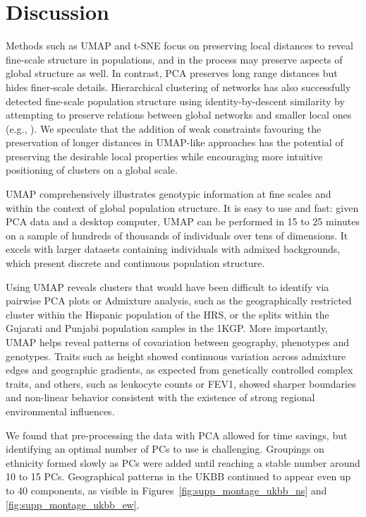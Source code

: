 \section{Discussion}
Methods such as UMAP and t-SNE focus on preserving local distances to reveal fine-scale structure in populations, and in the process may preserve aspects of global structure as well. In contrast, PCA preserves long range distances but hides finer-scale details. Hierarchical clustering of networks has also successfully detected fine-scale population structure using identity-by-descent similarity by attempting to preserve relations between global networks and smaller local ones (e.g., \citep{han2017clustering}). We speculate that the addition of weak constraints favouring the preservation of longer distances in UMAP-like approaches has the potential of preserving the desirable local properties while encouraging more intuitive positioning of clusters on a global scale.

UMAP comprehensively illustrates genotypic information at fine scales and within the context of global population structure. It is easy to use and fast: given PCA data and a desktop computer, UMAP can be performed in 15 to 25 minutes on a sample of hundreds of thousands of individuals over tens of dimensions. It excels with larger datasets containing individuals with admixed backgrounds, which present discrete and continuous population structure.

Using UMAP reveals clusters that would have been difficult to identify via pairwise PCA plots or Admixture analysis, such as the geographically restricted cluster within the Hispanic population of the HRS, or the splits within the Gujarati and Punjabi population samples in the 1KGP. More importantly, UMAP helps reveal patterns of covariation between geography, phenotypes and genotypes. Traits such as height showed continuous variation across admixture edges and geographic gradients, as expected from genetically controlled complex traits, and others, such as leukocyte counts or FEV1, showed sharper boundaries and non-linear behavior consistent with the existence of strong regional environmental influences. 

We found that pre-processing the data with PCA allowed for time savings, but identifying an optimal number of PCs to use is challenging. Groupings on ethnicity formed slowly as PCs were added until reaching a stable number around 10 to 15 PCs. Geographical patterns in the UKBB continued to appear even up to 40 components, as visible in Figures~\ref{fig:supp_montage_ukbb_ns} and \ref{fig:supp_montage_ukbb_ew}. 

